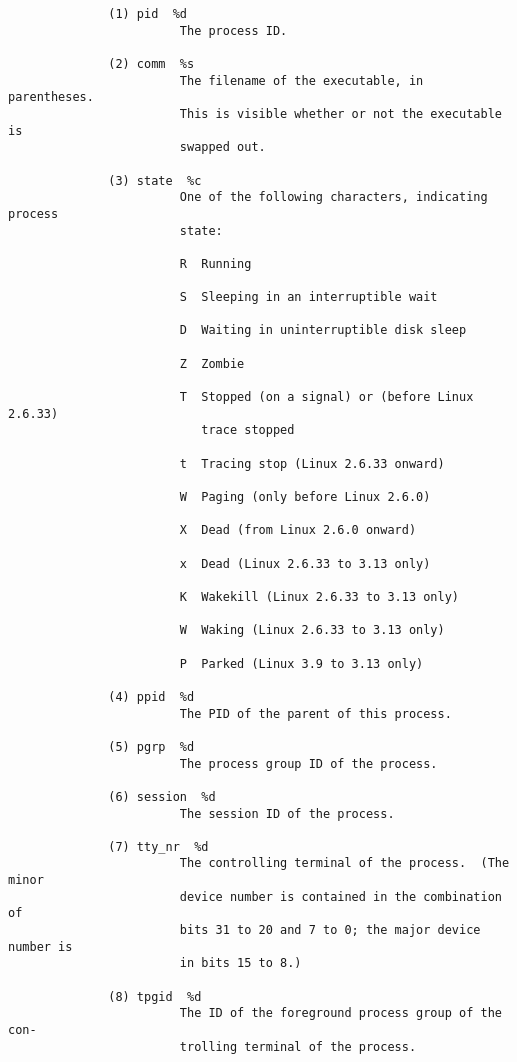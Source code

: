 \documentclass[]{article}
\begin{document}
\begin{verbatim}
              (1) pid  %d
                        The process ID.

              (2) comm  %s
                        The filename of the executable, in parentheses.
                        This is visible whether or not the executable is
                        swapped out.

              (3) state  %c
                        One of the following characters, indicating process
                        state:

                        R  Running

                        S  Sleeping in an interruptible wait

                        D  Waiting in uninterruptible disk sleep

                        Z  Zombie

                        T  Stopped (on a signal) or (before Linux 2.6.33)
                           trace stopped

                        t  Tracing stop (Linux 2.6.33 onward)

                        W  Paging (only before Linux 2.6.0)

                        X  Dead (from Linux 2.6.0 onward)

                        x  Dead (Linux 2.6.33 to 3.13 only)

                        K  Wakekill (Linux 2.6.33 to 3.13 only)

                        W  Waking (Linux 2.6.33 to 3.13 only)

                        P  Parked (Linux 3.9 to 3.13 only)

              (4) ppid  %d
                        The PID of the parent of this process.

              (5) pgrp  %d
                        The process group ID of the process.

              (6) session  %d
                        The session ID of the process.

              (7) tty_nr  %d
                        The controlling terminal of the process.  (The minor
                        device number is contained in the combination of
                        bits 31 to 20 and 7 to 0; the major device number is
                        in bits 15 to 8.)

              (8) tpgid  %d
                        The ID of the foreground process group of the con‐
                        trolling terminal of the process.


\end{verbatim}
\end{document}
